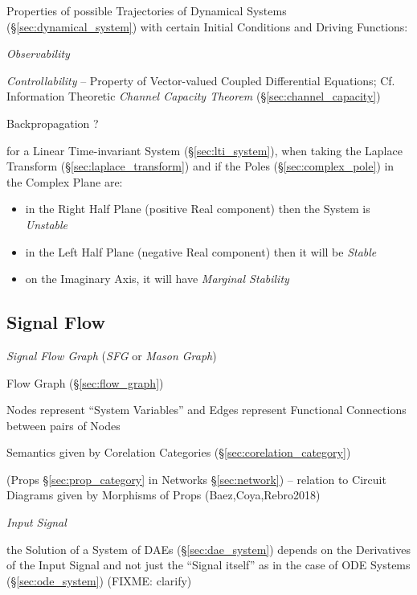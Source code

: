 Properties of possible Trajectories of Dynamical Systems
(\S\ref{sec:dynamical_system}) with certain Initial Conditions and
Driving Functions:

\emph{Observability}

\emph{Controllability} -- Property of Vector-valued Coupled
Differential Equations; \fist Cf. Information Theoretic \emph{Channel
  Capacity Theorem} (\S\ref{sec:channel_capacity})

Backpropagation ?


for a Linear Time-invariant System (\S\ref{sec:lti_system}), when taking the
Laplace Transform (\S\ref{sec:laplace_transform}) and if the Poles
(\S\ref{sec:complex_pole}) in the Complex Plane are:
\begin{itemize}
  \item in the Right Half Plane (positive Real component) then the System is
    \emph{Unstable}
  \item in the Left Half Plane (negative Real component) then it will be
    \emph{Stable}
  \item on the Imaginary Axis, it will have \emph{Marginal Stability}
\end{itemize}



\subsection{Signal Flow}\label{sec:signal_flow}

\emph{Signal Flow Graph} (\emph{SFG} or \emph{Mason Graph})

\fist Flow Graph (\S\ref{sec:flow_graph})

Nodes represent ``System Variables'' and Edges represent Functional
Connections between pairs of Nodes


Semantics given by Corelation Categories
(\S\ref{sec:corelation_category})

(Props \S\ref{sec:prop_category} in Networks \S\ref{sec:network}) -- relation to
Circuit Diagrams given by Morphisms of Props (Baez,Coya,Rebro2018)

\emph{Input Signal}

\fist the Solution of a System of DAEs (\S\ref{sec:dae_system}) depends on
the Derivatives of the Input Signal and not just the ``Signal itself'' as in
the case of ODE Systems (\S\ref{sec:ode_system})
(FIXME: clarify)



